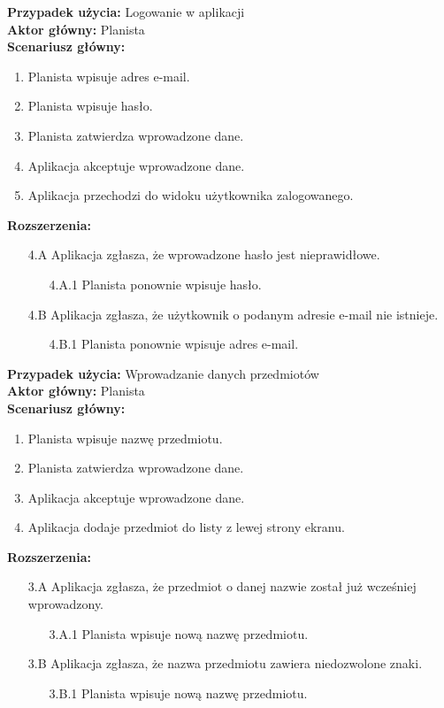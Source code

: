 \noindent
\textbf{Przypadek użycia:} Logowanie w aplikacji\\
\textbf{Aktor główny:} Planista\\
\textbf{Scenariusz główny:}
\begin{enumerate}
	\item Planista wpisuje adres e-mail.
	\item Planista wpisuje hasło.
	\item Planista zatwierdza wprowadzone dane.
	\item Aplikacja akceptuje wprowadzone dane.
	\item Aplikacja przechodzi do widoku użytkownika zalogowanego.
\end{enumerate}
\textbf{Rozszerzenia:}
	\begin{enumerate}
         \item[4.A] Aplikacja zgłasza, że wprowadzone hasło jest nieprawidłowe.
         \begin{enumerate}
         	\item[4.A.1] Planista ponownie wpisuje hasło.
         \end{enumerate}
         \item[4.B] Aplikacja zgłasza, że użytkownik o podanym adresie e-mail nie istnieje.
         \begin{enumerate}
         	\item[4.B.1] Planista ponownie wpisuje adres e-mail.
         \end{enumerate}
	\end{enumerate}
	
\noindent
\textbf{Przypadek użycia:} Wprowadzanie danych przedmiotów\\
\textbf{Aktor główny:} Planista\\
\textbf{Scenariusz główny:}
\begin{enumerate}
	\item Planista wpisuje nazwę przedmiotu.
	\item Planista zatwierdza wprowadzone dane.
	\item Aplikacja akceptuje wprowadzone dane.
	\item Aplikacja dodaje przedmiot do listy z lewej strony ekranu.
\end{enumerate}
\textbf{Rozszerzenia:}
	\begin{enumerate}
         \item[3.A] Aplikacja zgłasza, że przedmiot o danej nazwie został już wcześniej wprowadzony.
         \begin{enumerate}
         	\item[3.A.1] Planista wpisuje nową nazwę przedmiotu.
         \end{enumerate}
         \item[3.B] Aplikacja zgłasza, że nazwa przedmiotu zawiera niedozwolone znaki.
         \begin{enumerate}
         	\item[3.B.1] Planista wpisuje nową nazwę przedmiotu.
         \end{enumerate}
	\end{enumerate}
	
